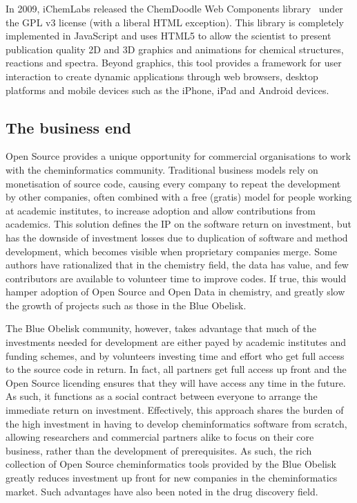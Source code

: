\documentclass[10pt]{bmc_article}
\newenvironment{bmcformat}{\fussy\setboolean{publ}{true}}{\fussy}
\begin{document}
\begin{bmcformat}
In 2009, iChemLabs released the ChemDoodle Web Components
library~\cite{ChemDoodleWeb} under the GPL v3 license (with a
liberal HTML exception). This library is completely implemented in JavaScript
and uses HTML5 to allow the scientist
to present publication quality 2D and 3D graphics and animations for
chemical structures, reactions and spectra. Beyond graphics, this tool
provides a framework for user interaction to create dynamic
applications through web browsers, desktop platforms and mobile
devices such as the iPhone, iPad and Android devices.

\subsection*{The business end}


Open Source provides a unique opportunity for commercial organisations to work with the
cheminformatics community. Traditional business models rely on monetisation of source
code, causing every company to repeat the development by other companies, often combined
with a free (gratis) model for people working at academic institutes, to increase adoption
and allow contributions from academics. This solution defines the IP on the software
return on investment, but has the downside of investment losses due to duplication of
software and method development, which becomes visible when proprietary companies
merge. Some authors have rationalized that in the chemistry field, the
data has value, and few contributors are available to volunteer time
to improve codes.\cite{Stahl:2005fk} If true, this would hamper
adoption of Open Source and Open Data in chemistry, and greatly slow
the growth of projects such as those in the Blue Obelisk.

The Blue Obelisk community, however, takes advantage that much of the investments needed
for development are either payed by academic institutes and funding schemes, and by
volunteers investing time and effort who get full access to the source code in return.
In fact, all partners get full access up front and the Open Source licending ensures
that they will have access any time in the future. As such, it functions as a social
contract between everyone to arrange the immediate return on investment. Effectively,
this approach shares the burden of the high investment in having to develop cheminformatics
software from scratch, allowing researchers and commercial partners alike to focus
on their core business, rather than the development of prerequisites. As such, the rich
collection of Open Source cheminformatics tools provided by the Blue Obelisk
greatly reduces investment up front for new companies in the
cheminformatics market. Such advantages have also been noted in the
drug discovery field.\cite{DeLano:2005uq}\cite{Munos:2006vn}\cite{Geldenhuys:2006kx}


\end{bmcformat}
\end{document}

